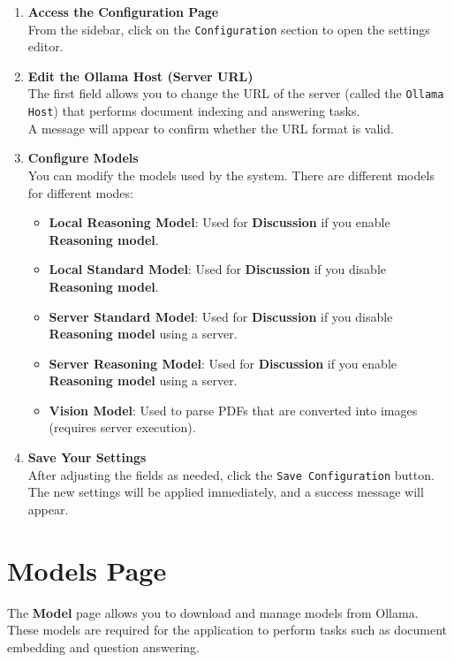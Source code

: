 \documentclass[11pt,a4paper]{report}
\begin{document}
\begin{enumerate}
    \item \textbf{Access the Configuration Page} \\
    From the sidebar, click on the \texttt{Configuration} section to open the settings editor.

    \item \textbf{Edit the Ollama Host (Server URL)} \\
    The first field allows you to change the URL of the server (called the \texttt{Ollama Host}) that performs document indexing and answering tasks.
    \\
A message will appear to confirm whether the URL format is valid.
   

    \item \textbf{Configure Models} \\
    You can modify the models used by the system. There are different models for different modes:
    \begin{itemize}
        \item \textbf{Local Reasoning Model}: Used for \textbf{Discussion} if you enable \textbf{Reasoning model}.
        \item \textbf{Local Standard Model}: Used for \textbf{Discussion} if you disable \textbf{Reasoning model}.
        \item \textbf{Server Standard Model}: Used for \textbf{Discussion} if you disable \textbf{Reasoning model} using a server. 
        \item \textbf{Server Reasoning Model}: Used for \textbf{Discussion} if you enable \textbf{Reasoning model} using a server. 
        \item \textbf{Vision Model}: Used to parse PDFs that are converted into images (requires server execution).
    \end{itemize}

    \item \textbf{Save Your Settings} \\
    After adjusting the fields as needed, click the \texttt{Save Configuration} button. The new settings will be applied immediately, and a success message will appear.
\end{enumerate}

\section{Models Page}

The \textbf{Model} page allows you to download and manage models from Ollama. These models are required for the application to perform tasks such as document embedding and question answering.
\end{document}
